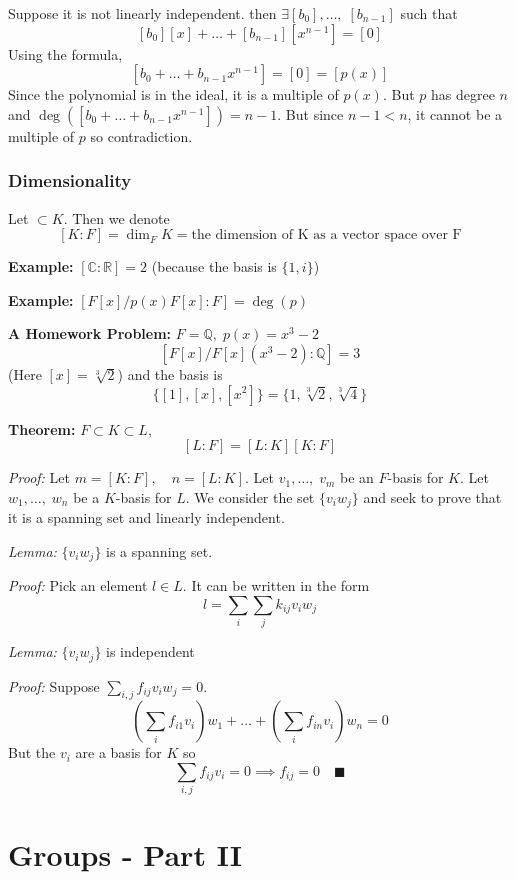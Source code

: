 \documentclass[12pt]{report}
\newcommand{\R}{\mathbb{R}}
\newcommand{\qed}{\quad \blacksquare}
\newcommand{\Q}{\mathbb{Q}}
\newcommand{\C}{\mathbb{C}}
\renewcommand{\indent}{\hspace*{0.5in}}
\begin{document}
        Suppose it is not linearly independent. then $\exists[b_0], \dots,\; [b_{n-1}]$ such that 
        \[[b_0][x] + \dots + [b_{n-1}][x^{n-1}] = [0]\]
        Using the formula, 
        \[[b_0 + \dots + b_{n-1} x^{n-1}] = [0] = [p(x)]\]
        Since the polynomial is in the ideal, it is a multiple of $p(x)$. But $p$ has degree $n$ and $\deg([b_0 + \dots + b_{n-1} x^{n-1}]) = n -1$. But since $n - 1 < n$, it cannot be a multiple of $p$ so contradiction. 

    \subsection*{Dimensionality}
        Let $\subset K$. Then we denote 
        \[[K : F] = \dim_F K = \text{the dimension of K as a vector space over F}\]

        \textbf{Example:} $[\C : \R] = 2$ (because the basis is $\{1, i\}$)

        \textbf{Example:} $[F[x]/ p(x)F[x] : F] = \deg(p)$

        \textbf{A Homework Problem:} $F = \Q, \; p(x) = x^3 -2$ 
            \[[F[x]/F[x](x^3-2) : \Q] = 3\] 
            (Here $[x] = \sqrt[3]{2}$) and the basis is 
            \[\{[1], [x], [x^2]\} = \{1, \sqrt[3]{2}, \sqrt[3]{4}\}\]

        \textbf{Theorem:} $F \subset K \subset L$, 
        \[[L : F] = [L : K][K : F]\]
            
            \emph{Proof:} Let $m = [K : F], \quad n = [L : K]$. Let $v_1, \dots,\; v_m$ be an $F$-basis for $K$. Let $w_1, \dots,\; w_n$ be a $K$-basis for $L$. We consider the set $\{v_i w_j\}$ and seek to prove that it is a spanning set and linearly independent. 

            \indent \emph{Lemma:} $\{v_iw_j\}$ is a spanning set. 

            \indent \emph{Proof:} Pick an element $l \in L$. It can be written in the form 
            \[l = \sum_i \sum_j k_{ij} v_i w_j\]

            \indent \emph{Lemma:} $\{v_iw_j\}$ is independent 

            \indent \emph{Proof:} Suppose $\sum_{i, j} f_{ij} v_i w_j = 0$. 
            \[\left(\sum_{i} f_{i1} v_i\right)w_1 + \dots +\left(\sum_{i} f_{in} v_i\right)w_n = 0\]
            \indent But the $v_i$ are a basis for $K$ so 
            \[\sum_{i,j} f_{ij} v_i = 0 \implies f_{ij} = 0 \qed\]


\chapter*{Groups - Part II}
\end{document}
